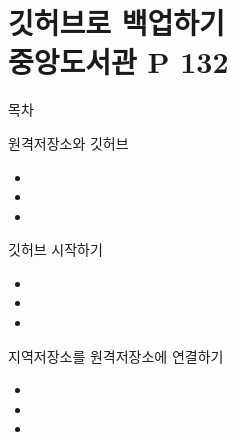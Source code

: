\documentclass[aspectratio=1610,20pt,xcolor=pdftex,dvipsnames,table,handout]{beamer}
\begin{document}
		\begin{frame} [t,plain]
		\end{frame}						

		\part{깃허브로 백업하기 \\ 중앙도서관 P 132}
		\frame{\partpage}

\label{part1} 	%


		\begin{frame} [plain]{목차}
		\tableofcontents%
		\end{frame}

		\begin{frame} [t,plain]
			\begin{block} {원격저장소와 깃허브}
			\setlength{\leftmargini}{1em}			
			\begin{itemize}
				\item 	
				\item 	
				\item 	
			\end{itemize}
			\end{block}						
		\end{frame}						

		\begin{frame} [t,plain]
			\begin{block} {깃허브 시작하기}
			\setlength{\leftmargini}{1em}			
			\begin{itemize}
				\item 	
				\item 	
				\item 	
			\end{itemize}
			\end{block}						
		\end{frame}						

		\begin{frame} [t,plain]
			\begin{block} {지역저장소를 원격저장소에 연결하기}
			\setlength{\leftmargini}{1em}			
			\begin{itemize}
				\item 	
				\item 	
				\item 	
			\end{itemize}
			\end{block}						
		\end{frame}						
\end{document}
